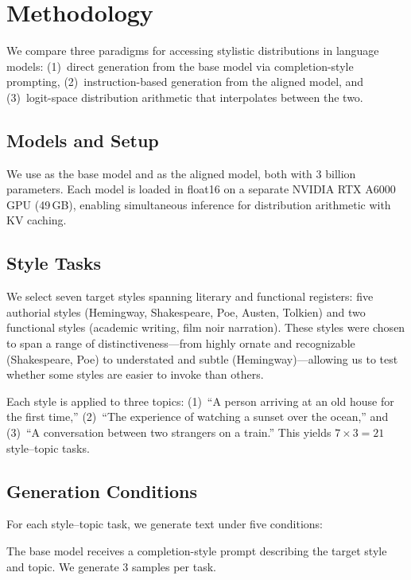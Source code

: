 \section{Methodology}
\label{sec:method}

We compare three paradigms for accessing stylistic distributions in language models:
(1)~direct generation from the base model via completion-style prompting,
(2)~instruction-based generation from the aligned model, and
(3)~logit-space distribution arithmetic that interpolates between the two.

\subsection{Models and Setup}
\label{sec:models}

We use \qwenbase as the base model and \qweninst as the aligned model, both with
3 billion parameters. Each model is loaded in float16 on a separate NVIDIA RTX
A6000 GPU (49\,GB), enabling simultaneous inference for distribution arithmetic
with KV caching.

\subsection{Style Tasks}
\label{sec:styles}

We select seven target styles spanning literary and functional registers:
five authorial styles (Hemingway, Shakespeare, Poe, Austen, Tolkien) and two
functional styles (academic writing, film noir narration). These styles were
chosen to span a range of distinctiveness---from highly ornate and recognizable
(Shakespeare, Poe) to understated and subtle (Hemingway)---allowing us to test
whether some styles are easier to invoke than others.

Each style is applied to three topics: (1)~``A person arriving at an old house
for the first time,'' (2)~``The experience of watching a sunset over the ocean,''
and (3)~``A conversation between two strangers on a train.'' This yields
$7 \times 3 = 21$ style--topic tasks.

\subsection{Generation Conditions}
\label{sec:conditions}

For each style--topic task, we generate text under five conditions:

The base model receives a completion-style prompt describing the target style and
topic. We generate 3 samples per task.

